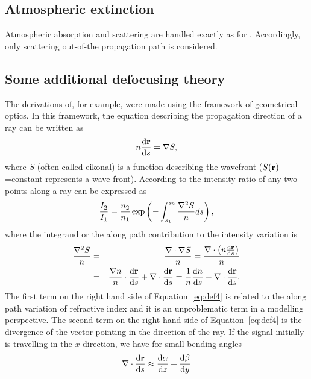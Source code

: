 \subsection{Atmospheric extinction}
\label{sec:rlink:atmext}
%
Atmospheric absorption and scattering are handled exactly as for
. Accordingly, only scattering
out-of-the propagation path is considered.



\subsection{Some additional defocusing theory}
\label{sec:rlink:defoc2}
%
The derivations of, for example, \citet{haugstad:78:turbu} were made using the
framework of geometrical optics. In this framework, the equation describing the
propagation direction of a ray can be written as
\begin{equation}
\label{eq:eik}
n\frac{\mathrm{d} \bf{\ensuremath{r}}}{\mathrm{d} s}=\nabla S,
\end{equation}
where \(S\) (often called eikonal) is a function describing the wavefront
(\(S(\bf{\ensuremath{r}})\)=constant represents a wave front). According to
\cite{born:80} the intensity ratio of any two points along a ray can be
expressed as
\begin{equation}
\frac{I_{2}}{I_{1}}=\frac{n_{2}}{n_{1}}
\exp \left(-\int_{s_{1}}^{s_{2}}\frac{\nabla^{2}S}{n}ds\right),
\end{equation}
where the integrand 
or the along path contribution to the intensity variation is
\begin{eqnarray}
\label{eq:def4}
\frac{\nabla^{2}S}{n} &=& \frac{\nabla \cdot \nabla S}{n}
=\frac{\nabla \cdot \left(n\frac{\mathrm{d} \bf{\ensuremath{r}}}{\mathrm{d} s}\right)}{n} \nonumber \\
& = & 
\frac{\nabla n}{n} \cdot \frac{\mathrm{d} \bf{\ensuremath{r}}}{\mathrm{d} s}
+\nabla \cdot \frac{\mathrm{d} \bf{\ensuremath{r}}}{\mathrm{d} s}=
\frac{1}{n}\frac{\mathrm{d} n}{\mathrm{d} s}+\nabla \cdot \frac{\mathrm{d} \bf{\ensuremath{r}}}{\mathrm{d} s}. 
\end{eqnarray}
The first term on the right hand side of Equation~\ref{eq:def4}
is related to the along path variation of refractive index and it is 
an unproblematic term in a modelling perspective.
The second term on the right hand side of Equation~\ref{eq:def4}
is the divergence of the vector pointing in the direction 
of the ray.  If the signal initially is travelling in the \(x\)-direction,
we have for small bending angles \citep{haugstad:78:turbu}
\begin{equation}
\label{eq:raydiv}
\nabla \cdot \frac{\mathrm{d} \bf{\ensuremath{r}}}{\mathrm{d} s}\approx
\frac{\mathrm{d} \alpha}{\mathrm{d} z}+\frac{\mathrm{d} \beta}{\mathrm{d} y}
\end{equation}
